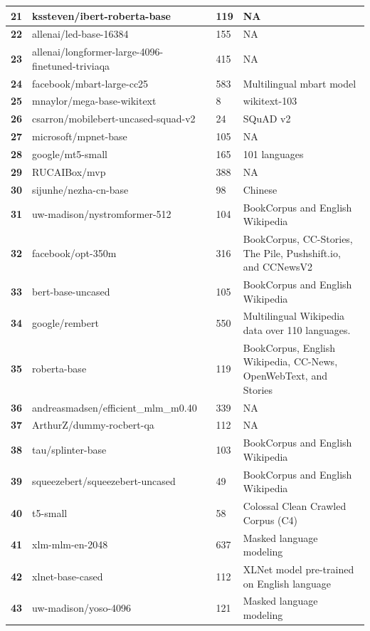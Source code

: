 \documentclass[11pt]{article}
\begin{document}
\begin{table}[htbp]
{\begin{tabular}{|l|l|l|l|}
\textbf{21} & kssteven/ibert-roberta-base  & 119 & NA \\ \hline
\textbf{22} & allenai/led-base-16384 & 155 & NA \\ \hline
\textbf{23} & allenai/longformer-large-4096-finetuned-triviaqa & 415 & NA \\ \hline
\textbf{24} & facebook/mbart-large-cc25 & 583 & Multilingual mbart model \\ \hline
\textbf{25} & mnaylor/mega-base-wikitext & 8 & wikitext-103 \\ \hline
\textbf{26} & csarron/mobilebert-uncased-squad-v2 & 24 & SQuAD v2 \\ \hline
\textbf{27} & microsoft/mpnet-base & 105 & NA \\ \hline
\textbf{28} & google/mt5-small & 165 & 101 languages \\ \hline
\textbf{29} & RUCAIBox/mvp  & 388 & NA \\ \hline
\textbf{30} & sijunhe/nezha-cn-base & 98 & Chinese \\ \hline
\textbf{31} & uw-madison/nystromformer-512 & 104 & BookCorpus and English Wikipedia \\ \hline
\textbf{32} & facebook/opt-350m  & 316 & BookCorpus, CC-Stories, The Pile, Pushshift.io, and CCNewsV2 \\ \hline
\textbf{33} & bert-base-uncased  & 105 & BookCorpus and English Wikipedia \\ \hline
\textbf{34} & google/rembert  & 550 & Multilingual Wikipedia data over 110 languages. \\ \hline
\textbf{35} & roberta-base  & 119 & BookCorpus, English Wikipedia, CC-News, OpenWebText, and Stories \\ \hline
\textbf{36} & andreasmadsen/efficient\_mlm\_m0.40 & 339 & NA \\ \hline
\textbf{37} & ArthurZ/dummy-rocbert-qa & 112 & NA \\ \hline
\textbf{38} & tau/splinter-base  & 103 & BookCorpus and English Wikipedia \\ \hline
\textbf{39} & squeezebert/squeezebert-uncased  & 49 & BookCorpus and English Wikipedia \\ \hline
\textbf{40} & t5-small  & 58 & Colossal Clean Crawled Corpus (C4) \\ \hline
\textbf{41} & xlm-mlm-en-2048  & 637 & Masked language modeling \\ \hline
\textbf{42} & xlnet-base-cased  & 112 & XLNet model pre-trained on English language \\ \hline
\textbf{43} & uw-madison/yoso-4096 & 121 & Masked language modeling \\ \hline

\end{tabular}}
\end{table}
\end{document}
